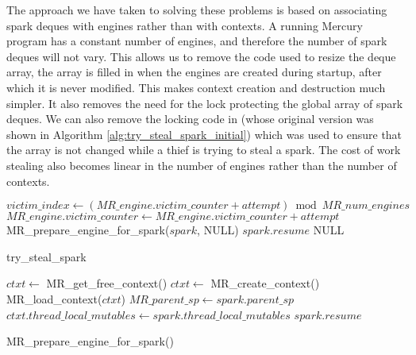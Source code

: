 The approach we have taken to solving these problems is based on associating
spark deques with engines rather than with contexts.
A running Mercury program has a constant number of engines,
and therefore the number of spark deques will not vary.
This allows us to remove the code used to resize the deque array,
the array is filled in when the engines are created during startup,
after which it is never modified.
This makes context creation and destruction much simpler.
It also removes the need for the lock protecting the global array of spark
deques.
We can also remove the locking code in \trystealspark
(whose original version was shown in Algorithm
\ref{alg:try_steal_spark_initial})
which was used to
ensure that the array is not changed while a thief is trying to steal a
spark.
The cost of work stealing also becomes linear in the number of engines
rather than the number of contexts.

\begin{algorithm}[tbp]
\begin{algorithmic}[1]
      \State $victim\_index \gets
          (MR\_engine.victim\_counter + attempt) \bmod MR\_num\_engines$
        \State $MR\_engine.victim\_counter \gets
          MR\_engine.victim\_counter + attempt$
        \State MR\_prepare\_engine\_for\_spark($spark$, NULL)
        \State \Return $spark.resume$
      \EndIf
    \EndFor
  \EndIf
  \State \Return NULL
\EndProcedure
\end{algorithmic}
\caption{try\_steal\_spark}
\label{alg:try_steal_spark_revised}
\end{algorithm}

\begin{algorithm}[tbp]
\begin{algorithmic}
        \State $ctxt \gets$ MR\_get\_free\_context()
            \State $ctxt \gets$ MR\_create\_context()
        \EndIf
        \State MR\_load\_context($ctxt$)
    \EndIf
    \State $MR\_parent\_sp \gets spark.parent\_sp$
    \State $ctxt.thread\_local\_mutables \gets
      spark.thread\_local\_mutables$
    \State \Return $spark.resume$
\EndProcedure
\end{algorithmic}
\caption{MR\_prepare\_engine\_for\_spark()}
\label{alg:prepare_engine_for_spark}
\end{algorithm}

